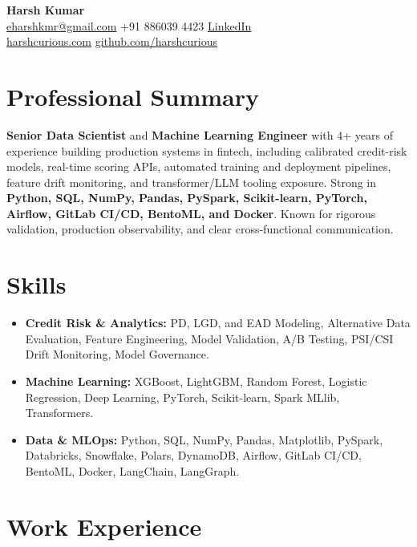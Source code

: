 \documentclass[10pt, letterpaper]{article}
\begin{document}
\pagestyle{empty}

\begin{center}
    {\Huge \textbf{Harsh Kumar}} \\[1.5ex]
    \href{mailto:eharshkmr@gmail.com}{eharshkmr@gmail.com} \textbar{} +91 886039 4423 \textbar{} \href{https://linkedin.com/in/harsh-kumar-a7b98198}{LinkedIn} \\[0.5ex]
    \href{https://harshcurious.com}{harshcurious.com} \textbar{} \href{https://github.com/harshcurious}{github.com/harshcurious}
\end{center}

\section*{Professional Summary}
\textbf{Senior Data Scientist} and \textbf{Machine Learning Engineer} with 4+ years of experience building production systems in fintech, including calibrated credit-risk models, real-time scoring APIs, automated training and deployment pipelines, feature drift monitoring, and transformer/LLM tooling exposure. Strong in \textbf{Python, SQL, NumPy, Pandas, PySpark, Scikit-learn, PyTorch, Airflow, GitLab CI/CD, BentoML, and Docker}. Known for rigorous validation, production observability, and clear cross-functional communication.

\section*{Skills}
\begin{itemize}[leftmargin=0.15in, label={}]
    \item \textbf{Credit Risk \& Analytics:} PD, LGD, and EAD Modeling, Alternative Data Evaluation, Feature Engineering, Model Validation, A/B Testing, PSI/CSI Drift Monitoring, Model Governance.
    \item \textbf{Machine Learning:} XGBoost, LightGBM, Random Forest, Logistic Regression, Deep Learning, PyTorch, Scikit-learn, Spark MLlib, Transformers.
    \item \textbf{Data \& MLOps:} Python, SQL, NumPy, Pandas, Matplotlib, PySpark, Databricks, Snowflake, Polars, DynamoDB, Airflow, GitLab CI/CD, BentoML, Docker, LangChain, LangGraph.
\end{itemize}

\section*{Work Experience}
\end{document}
